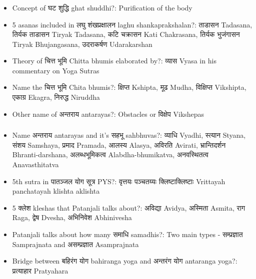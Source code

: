 \begin{frame}[fragile]\frametitle{}
\begin{itemize}
\item Concept of घट शुद्धि ghat shuddhi?: Purification of the body
\item 5 asanas included in लघु शंखप्रक्षालन laghu shankaprakshalan?: ताडासन Tadasana, तिर्यक ताडासन Tiryak Tadasana, कटि चक्रासन Kati Chakrasana, तिर्यक भुजंगासन Tiryak Bhujangasana, उदराकर्षण Udarakarshan
\item Theory of चित्त भूमि Chitta bhumis elaborated by?: व्यास Vyasa in his commentary on Yoga Sutras
\item Name the चित्त भूमि Chita bhumis?: क्षिप्त Kshipta, मूढ Mudha, विक्षिप्त Vikshipta, एकाग्र Ekagra, निरुद्ध Niruddha
\item Other name of अन्तराय antarayas?: Obstacles or विक्षेप Vikshepas
\end{itemize}
\end{frame}

\begin{frame}[fragile]\frametitle{}
\begin{itemize}
\item Name अन्तराय antarayas and it's सहभू sahbhuvas?: व्याधि Vyadhi, स्त्यान Styana, संशय Samshaya, प्रमाद Pramada, आलस्य Alasya, अविरति Avirati, भ्रान्तिदर्शन Bhranti-darshana, अलब्धभूमिकत्व Alabdha-bhumikatva, अनवस्थितत्व Anavasthitatva
\item 5th sutra in पातञ्जल योग सूत्र PYS?: वृत्तयः पञ्चतय्यः क्लिष्टाक्लिष्टाः Vrittayah panchatayah klishta aklishta
\item 5 क्लेश kleshas that Patanjali talks about?: अविद्या Avidya, अस्मिता Asmita, राग Raga, द्वेष Dvesha, अभिनिवेश Abhinivesha
\item Patanjali talks about how many समाधि samadhis?: Two main types - सम्प्रज्ञात Samprajnata and असम्प्रज्ञात Asamprajnata
\item Bridge between बहिरंग योग bahiranga yoga and अन्तरंग योग antaranga yoga?: प्रत्याहार Pratyahara
\end{itemize}
\end{frame}

